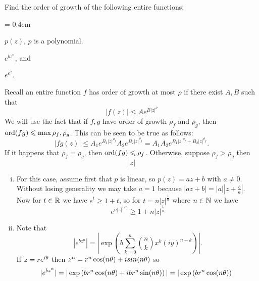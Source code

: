 \documentclass[12pt]{memoir}
\begin{document}
\begin{Ej}
    Find the order of growth of the following entire functions:
    \begin{enumerate}[i)]
        \itemsep=-0.4em
        \begin{multicols}{3}
        \item $p(z)$, $p$ is a polynomial.
        \item $e^{bz^n}$, and
        \item $e^{e^z}$.
        \end{multicols}
    \end{enumerate}
\end{Ej}

\begin{ptcbr}
    Recall an entire function $f$ has order of growth at most $\rho$ if there exist $A,B$ such that 
    $$|f(z)|\leq Ae^{B|z|^\rho}$$
    We will use the fact that if $f,g$ have order of growth $\rho_f$ and $\rho_g$, then $\operatorname{ord}(fg)\leqslant\max{\rho_f,\rho_g}$. This can be seen to be true as follows:
    $$|fg(z)|\leq A_1e^{B_1|z|^{\rho_f}}A_2e^{B_2|z|^{\rho_g}}=A_1A_2e^{B_1|z|^{\rho_f}+B_2|z|^{\rho_g}}.$$
    If it happens that $\rho_f=\rho_g$, then $\operatorname{ord}(fg)\leqslant\rho_f$. Otherwise, suppose $\rho_f>\rho_g$ then 
    $$|z|$$
    \begin{enumerate}[i)]
        \itemsep=-0.4em
        \item For this case, assume first that $p$ is linear, so $p(z)=az+b$ with $a\neq 0$. Without losing generality we may take $a=1$ because $|az+b|=|a|\left|z+\frac{b}{a}\right|$. Now for $t\in\mathbb{R}$ we have $e^{t}\geq 1+t$, so for $t=n|z|^{\frac{1}{n}}$ where $n\in\mathbb{N}$ we have 
        $$e^{n|z|^{1/n}}\geq 1+n|z|^{\frac{1}{n}}$$
        \item Note that 
        $$|e^{bz^n}|=\left|\exp\left(b\sum_{k=0}^n\binom{n}{k}x^k(iy)^{n-k}\right)\right|.$$
        If $z=re^{i\theta}$ then $z^n=r^n\cos(n\theta)+isin(n\theta)$ so
        $$|e^{bz^n}|=|\exp\left(br^n\cos(n\theta)+ibr^n\sin(n\theta)\right)|=|\exp\left(br^n\cos(n\theta)\right)|$$ 
    \end{enumerate}
\end{ptcbr}
\end{document}
